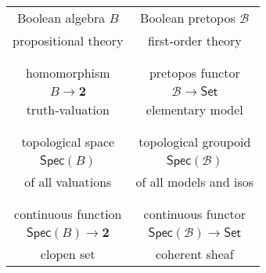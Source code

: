 \documentclass[12pt]{article}
\theoremstyle{remark}
\theoremstyle{definition}
\begin{document}
\begin{center}
\begin{tabular}{c|c}
Boolean algebra $B$ & Boolean pretopos $\mathcal{B}$ \\
propositional theory & first-order theory \\
\\
\hline\\
 homomorphism & pretopos functor\\
$B\to \mathbf{2}$ &  $\mathcal{B}\to \mathsf{Set}$ \\
truth-valuation & elementary model \\
\\
\hline\\
 topological space & topological groupoid \\
 $\mathsf{Spec}(B)$ & $\mathsf{Spec}(\mathcal{B})$ \\
of all valuations & of all models and isos \\
\\
\hline\\
 continuous function & continuous functor \\
$\mathsf{Spec}(B) \to \mathbf{2}$  & $\mathsf{Spec}(\mathcal{B}) \to \mathsf{Set}$\\
clopen set & coherent sheaf 
\end{tabular}
\end{center}

\end{document}
